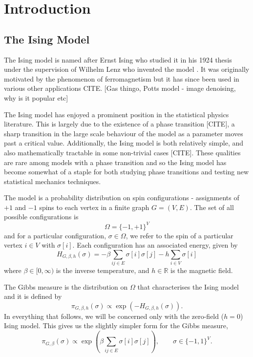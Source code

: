 \chapter{Introduction}
\label{Ch:CouplingIntro}



\section{The Ising Model}
\label{sec:Ising}
	The Ising model is named after Ernst Ising who studied it in his 1924 thesis \cite{Ising1925-nd} under the supervision of Wilhelm Lenz who invented the model \cite{Lenz1920-bn}. It was originally motivated by the phenomenon of ferromagnetism but it has since been used in various other applications CITE. [Gas thingo, Potts model - image denoising, why is it popular etc]

	The Ising model has enjoyed a prominent position in the statistical physics literature. This is largely due to the existence of a phase transition [CITE], a sharp transition in the large scale behaviour of the model as a parameter moves past a critical value. Additionally, the Ising model is both relatively simple, and also mathematically tractable in some non-trivial cases [CITE]. These qualities are rare among models with a phase transition and so the Ising model has become somewhat of a staple for both studying phase transitions and testing new statistical mechanics techniques.

	The model is a probability distribution on spin configurations - assignments of $+1$ and $-1$ spins to each vertex in a finite graph $G = (V, E)$. The set of all possible configurations is
	\begin{equation}
		\Omega = \{-1, +1\}^V
	\end{equation}
	and for a particular configuration, $\sigma \in \Omega$, we refer to the spin of a particular vertex $i \in V$ with $\sigma[i]$. Each configuration has an associated energy, given by 
	\begin{equation}
		H_{G, \beta, h}(\sigma) = -\beta \sum_{ij \in E} \sigma[i] \sigma[j] - h\sum_{i \in V} \sigma[i]
	\end{equation}
	where $\beta \in [0, \infty)$ is the inverse temperature, and $h \in \mathbb{R}$ is the magnetic field. 

	The Gibbs measure is the distribution on $\Omega$ that characterises the Ising model and it is defined by
	\begin{equation}
		\pi_{G, \beta, h}(\sigma) \propto \exp(-H_{G, \beta, h}(\sigma)).
		\label{eq:gibbsmeasurefull}
	\end{equation}
	In everything that follows, we will be concerned only with the zero-field ($h = 0$) Ising model. This gives us the slightly simpler form for the Gibbs measure,
	\begin{equation}
		\pi_{G, \beta}(\sigma) \propto \exp \left( \beta \sum_{ij \in E} \sigma[i] \sigma[j] \right), \qquad \sigma \in \{-1, 1\}^V.
		\label{eq:gibbsmeasure}
	\end{equation}

